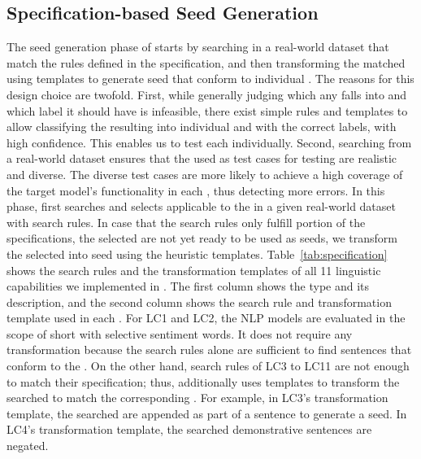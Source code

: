 \subsection{Specification-based Seed Generation}
The seed generation phase of \tool starts by searching \sents in a
real-world dataset that match the rules defined in the \lc
specification, and then transforming the matched \sents using
templates to generate seed \sents that conform to individual
\lcs. The reasons for this design choice are twofold.  First, while
generally judging which \lc any \sent falls into and which label it
should have is infeasible, there exist simple rules and templates to
allow classifying the resulting \sents into individual \lcs and
with the correct labels, with high confidence.  This enables us to
test each \lc individually.  Second, searching from a real-world
dataset ensures that the \sents used as test cases for testing \lcs
are realistic and diverse. The diverse test cases are more likely to
achieve a high coverage of the target model's functionality in each
\lc, thus detecting more errors.
%
In this phase, \tool first searches and selects \sents applicable to
the \lc in a given real-world dataset with search rules. In case that
the search rules only fulfill portion of the \lc specifications, the
selected \sents are not yet ready to be used as seeds, we
transform the selected \sents into seed \sents using the
heuristic templates.
%
Table~\ref{tab:specification} shows the search rules and the
transformation templates of all 11 linguistic capabilities we
implemented in \tool. The first column shows the \lc type and its
description, and the second column shows the search rule and
transformation template used in each \lc. For LC1 and LC2, the NLP
models are evaluated in the scope of short \sents with selective
sentiment words. It does not require any
transformation because the search rules alone are sufficient to find sentences that conform
to the \lcs. On the other hand, search rules of LC3 to LC11 are not enough to match their \lc specification; thus, \tool additionally uses 
templates to transform the searched \sents to match the corresponding \lc. For example, in LC3's transformation template, the searched \sents are appended as part of a sentence to generate a seed.
In LC4's transformation template, the searched demonstrative sentences are negated.

